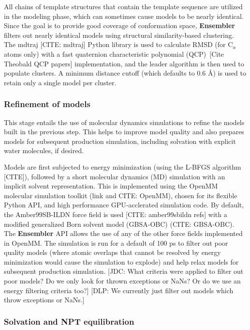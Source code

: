 \documentclass[aps,pre,twocolumn,nofootinbib,superscriptaddress,linenumbers]{revtex4-1}
\begin{document}
All chains of template structures that contain the template sequence are utilized in the modeling phase, which can sometimes cause models to be nearly identical.
Since the goal is to provide good coverage of conformation space, {\bf Ensembler} filters out nearly identical models using structural similarity-based clustering.
The mdtraj {\color{red}[CITE: mdtraj]} Python library is used to calculate RMSD (for C$_\alpha$ atoms only) with a fast quaternion characteristic polynomial (QCP)~{\color{red}[Cite Theobald QCP papers]} implementation, and the leader algorithm is then used to populate clusters.
A minimum distance cutoff (which defaults to 0.6 \AA) is used to retain only a single model per cluster.

\subsubsection*{Refinement of models}

This stage entails the use of molecular dynamics simulations to refine the models built in the previous step.
This helps to improve model quality and also prepares models for subsequent production simulation, including solvation with explicit water molecules, if desired.

Models are first subjected to energy minimization (using the L-BFGS algorithm {\color{red}[CITE]}), followed by a short molecular dynamics (MD) simulation with an implicit solvent representation.
This is implemented using the OpenMM molecular simulation toolkit (link and CITE: OpenMM), chosen for its flexible Python API, and high performance GPU-acclerated simulation code.
By default, the Amber99SB-ILDN force field is used {\color{red}[CITE: amber99sbildn refs]} with a modified generalized Born solvent model (GBSA-OBC) (CITE: GBSA-OBC).
The {\bf Ensembler} API allows the use of any of the other force fields implemented in OpenMM.
The simulation is run for a default of 100 ps to filter out poor quality models (where atomic overlaps that cannot be resolved by energy minimization would cause the simulation to explode) and help relax models for subsequent production simulation.
{\color{red}[JDC: What criteria were applied to filter out poor models?  Do we only look for thrown exceptions or NaNs?  Or do we use an energy filtering criteria too?]}
{\color{blue}[DLP: We currently just filter out models which throw exceptions or NaNs.]}

\subsubsection*{Solvation and NPT equilibration}
\end{document}
